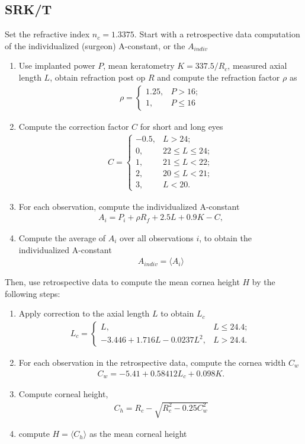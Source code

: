 \documentclass[article,twocolumn,preprint,10pt]{paper}%
\renewcommand{\(}{\left(}
\renewcommand{\)}{\right)}
\renewcommand{\[}{\left[}
\renewcommand{\]}{\right]}
\newcommand{\beq}{\begin{eqnarray}}
\newcommand{\eeq}{\end{eqnarray}}
\newcommand{\1}{\mbox{\boldmath$1$}}
\begin{document}
\subsection{SRK/T}\label{subsection:srkt}
Set the refractive index $n_c=1.3375$. Start with a retrospective data computation of the individualized (surgeon) A-constant, or the $A_{indiv}$
\begin{enumerate}
	\item Use implanted power $P$, mean keratometry $K = 337.5/R_c$, measured axial length $L$, obtain refraction post op $R$ and compute the refraction factor $\rho$ as
	\beq 
	\rho =\begin{cases} 
		 1.25, & P>16;\\ 
		 1, & P \leq 16
		\end{cases}
	\eeq 
	\item Compute the correction factor $C$ for short and long eyes 
	\beq 
	C = \begin{cases}
		-0.5, & L>24;\\
		0, & 22\leq L\leq24;\\
		1, & 21 \leq L<22;\\
		2, & 20\leq L<21;\\
		3, & L<20.
	\end{cases}
	\eeq 
	\item For each observation, compute the individualized A-constant 
	\beq 
	A_{i} = P_i+\rho R_f+2.5L+0.9K-C,
	\eeq 
	\item Compute the average of $A_i$ over all observations $i$, to obtain the individualized A-constant
	\beq 
	A_{indiv} = \langle A_i\rangle
	\eeq 
\end{enumerate}

Then, use retrospective data to compute  the mean cornea height $H$ by the following steps:
\begin{enumerate} 
	\item Apply correction to the axial length $L$ to obtain $L_c$
	\beq 
	 L_c = \begin{cases}
	 	L, & L\leq 24.4;\\
	 	-3.446 +1.716L-0.0237L^2, & L>24.4.
	 \end{cases}
	\eeq 
	\item For each observation in the retrospective data, compute the cornea width $C_w$ 
	\beq
	 C_w = - 5.41 + 0.58412L_c + 0.098K.
	\eeq 
	\item Compute corneal height,
	\beq 
	   C_h = R_c-\sqrt{R_c^2 -0.25C_w^2}
	\eeq 
	\item compute $H=\langle C_h\rangle$ as the mean corneal height 	
\end{enumerate}
\end{document}
